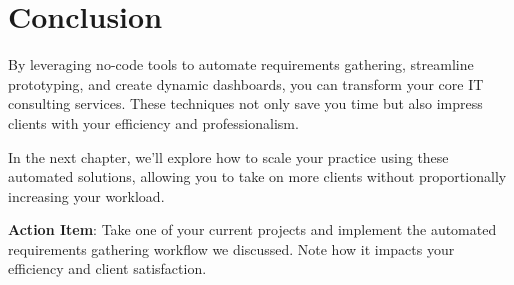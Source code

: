 \section{Conclusion}

By leveraging no-code tools to automate requirements gathering, streamline prototyping, and create dynamic dashboards, you can transform your core IT consulting services. These techniques not only save you time but also impress clients with your efficiency and professionalism.

In the next chapter, we'll explore how to scale your practice using these automated solutions, allowing you to take on more clients without proportionally increasing your workload.

\textbf{Action Item}: Take one of your current projects and implement the automated requirements gathering workflow we discussed. Note how it impacts your efficiency and client satisfaction.


